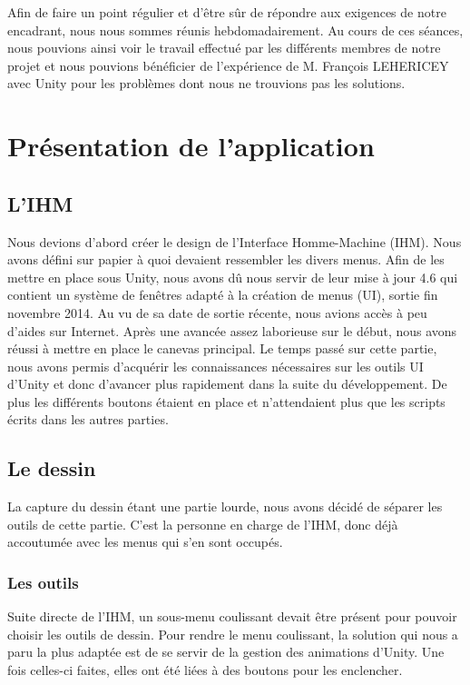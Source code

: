 \documentclass[a4paper,11pt]{article}
\begin{document}
	Afin de faire un point régulier et d'être sûr de répondre aux exigences de notre encadrant, nous nous sommes réunis hebdomadairement. Au cours de ces séances, nous pouvions ainsi voir le travail effectué par les différents membres de notre projet et nous pouvions bénéficier de l'expérience de M. François LEHERICEY avec Unity pour les problèmes dont nous ne trouvions pas les solutions.
	\section{Présentation de l'application}
		\subsection{L'IHM}
			Nous devions d'abord créer le design de l'Interface Homme-Machine (IHM). Nous avons défini sur papier à quoi devaient ressembler les divers menus. Afin de les mettre en place sous Unity, nous avons dû nous servir de leur mise à jour 4.6 qui contient un système de fenêtres adapté à la création de menus (UI), sortie fin novembre 2014. Au vu de sa date de sortie récente, nous avions accès à peu d'aides sur Internet. Après une avancée assez laborieuse sur le début, nous avons réussi à mettre en place le canevas principal.
			Le temps passé sur cette partie, nous avons permis d'acquérir les connaissances nécessaires sur les outils UI d'Unity et donc d'avancer plus rapidement dans la suite du développement. De plus les différents boutons étaient en place et n'attendaient plus que les scripts écrits dans les autres parties.
		
		\subsection{Le dessin}
			La capture du dessin étant une partie lourde, nous avons décidé de séparer les outils de cette partie. C'est la personne en charge de l'IHM, donc déjà accoutumée avec les menus qui s'en sont occupés.
		
		
			\subsubsection{Les outils}				
				Suite directe de l'IHM, un sous-menu coulissant devait être présent pour pouvoir choisir les outils de dessin. Pour rendre le menu coulissant, la solution qui nous a paru la plus adaptée est de se servir de la gestion des animations d'Unity. Une fois celles-ci faites, elles ont été liées à des boutons pour les enclencher.
					
\end{document}
